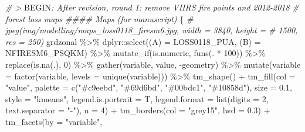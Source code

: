 \documentclass[10pt,landscape,a3paper]{article}
\newenvironment{Shaded}{\begin{snugshade}}{\end{snugshade}}
\newcommand{\AttributeTok}[1]{\textcolor[rgb]{0.77,0.63,0.00}{#1}}
\newcommand{\CommentTok}[1]{\textcolor[rgb]{0.56,0.35,0.01}{\textit{#1}}}
\newcommand{\DecValTok}[1]{\textcolor[rgb]{0.00,0.00,0.81}{#1}}
\newcommand{\FloatTok}[1]{\textcolor[rgb]{0.00,0.00,0.81}{#1}}
\newcommand{\FunctionTok}[1]{\textcolor[rgb]{0.00,0.00,0.00}{#1}}
\newcommand{\NormalTok}[1]{#1}
\newcommand{\OtherTok}[1]{\textcolor[rgb]{0.56,0.35,0.01}{#1}}
\newcommand{\RegionMarkerTok}[1]{#1}
\newcommand{\SpecialCharTok}[1]{\textcolor[rgb]{0.00,0.00,0.00}{#1}}
\newcommand{\StringTok}[1]{\textcolor[rgb]{0.31,0.60,0.02}{#1}}
\begin{document}
\begin{Shaded}
\begin{Highlighting}[]

\CommentTok{\# \textgreater{} }\RegionMarkerTok{BEGIN}\CommentTok{: After revision, round 1: remove VIIRS fire points and 2012{-}2018}
\CommentTok{\# forest loss maps \#\#\#\# Maps (for manuscript)}
\NormalTok{\{}
    \CommentTok{\# jpeg(\textquotesingle{}img/modelling/maps\_loss0118\_firesm6.jpg\textquotesingle{}, width = 3840, height =}
    \CommentTok{\# 1500, res = 250)}
\NormalTok{    grdzonal }\SpecialCharTok{\%\textgreater{}\%}
\NormalTok{        dplyr}\SpecialCharTok{::}\FunctionTok{select}\NormalTok{(}\StringTok{\textasciigrave{}}\AttributeTok{(A)}\StringTok{\textasciigrave{}} \OtherTok{=}\NormalTok{ LOSS0118\_PUA, }\StringTok{\textasciigrave{}}\AttributeTok{(B)}\StringTok{\textasciigrave{}} \OtherTok{=}\NormalTok{ NFIRESM6\_PSQKM) }\SpecialCharTok{\%\textgreater{}\%}
        \FunctionTok{mutate\_if}\NormalTok{(is.numeric, }\FunctionTok{funs}\NormalTok{(. }\SpecialCharTok{*} \DecValTok{100}\NormalTok{)) }\SpecialCharTok{\%\textgreater{}\%}
        \FunctionTok{replace}\NormalTok{(}\FunctionTok{is.na}\NormalTok{(.), }\DecValTok{0}\NormalTok{) }\SpecialCharTok{\%\textgreater{}\%}
        \FunctionTok{gather}\NormalTok{(variable, value, }\SpecialCharTok{{-}}\NormalTok{geometry) }\SpecialCharTok{\%\textgreater{}\%}
        \FunctionTok{mutate}\NormalTok{(}\AttributeTok{variable =} \FunctionTok{factor}\NormalTok{(variable, }\AttributeTok{levels =} \FunctionTok{unique}\NormalTok{(variable))) }\SpecialCharTok{\%\textgreater{}\%}
        \FunctionTok{tm\_shape}\NormalTok{() }\SpecialCharTok{+} \FunctionTok{tm\_fill}\NormalTok{(}\AttributeTok{col =} \StringTok{"value"}\NormalTok{, }\AttributeTok{palette =} \FunctionTok{c}\NormalTok{(}\StringTok{"\#c9eebd"}\NormalTok{, }\StringTok{"\#69d6bd"}\NormalTok{, }\StringTok{"\#00bdc1"}\NormalTok{,}
        \StringTok{"\#10858d"}\NormalTok{), }\AttributeTok{size =} \FloatTok{0.1}\NormalTok{, }\AttributeTok{style =} \StringTok{"kmeans"}\NormalTok{, }\AttributeTok{legend.is.portrait =}\NormalTok{ T, }\AttributeTok{legend.format =} \FunctionTok{list}\NormalTok{(}\AttributeTok{digits =} \DecValTok{2}\NormalTok{,}
        \AttributeTok{text.separator =} \StringTok{"{-}"}\NormalTok{), }\AttributeTok{n =} \DecValTok{4}\NormalTok{) }\SpecialCharTok{+} \FunctionTok{tm\_borders}\NormalTok{(}\AttributeTok{col =} \StringTok{"grey15"}\NormalTok{, }\AttributeTok{lwd =} \FloatTok{0.3}\NormalTok{) }\SpecialCharTok{+} \FunctionTok{tm\_facets}\NormalTok{(}\AttributeTok{by =} \StringTok{"variable"}\NormalTok{,}

\end{Highlighting}
\end{Shaded}
\end{document}
